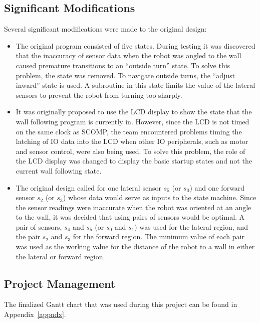 \subsection{Significant Modifications}

Several significant modifications were made to the original design:

\begin{itemize}
\item The original program consisted of five states. During testing it
  was discovered that the inaccuracy of sensor data when the robot was
  angled to the wall caused premature transitions to an ``outside turn'' state. To
  solve this problem, the state was removed. To navigate outside
  turns, the ``adjust inward'' state is used. A subroutine in this state
  limits the value of the lateral sensors to prevent the robot from
  turning too sharply. 
\item It was originally proposed to use the LCD display to
  show the state that the wall following program is currently
  in. However, since the LCD is not timed on the same clock as
  SCOMP, the team encountered problems timing the latching of IO
  data into the LCD when other IO peripherals,
  such as motor and sensor control, were also being used. To solve
  this problem, the role of  the LCD display was changed to display
  the basic startup states and  not the current wall following  state. 
\item The original design called for one lateral sensor \(s_5\) (or \(s_0\)) and
  one forward sensor \(s_2\) (or \(s_3\)) whose data would serve as inputs to the
  state machine. Since the sensor readings were inaccurate when the
  robot was oriented at an angle to the wall, it was decided that
  using pairs of sensors would be optimal. A pair of sensors, \(s_4\)
  and \(s_5\) (or \(s_0\) and \(s_1\)) was used for the lateral
  region, and the pair \(s_2\) and \(s_3\) for the forward region. The
  minimum value of each pair was used as the working value for the
  distance of the robot to a wall in either the lateral or forward region.
\end{itemize}


\subsection{Project Management}

The finalized Gantt chart that was used during this project can be found in Appendix~\ref{appndx}. 
